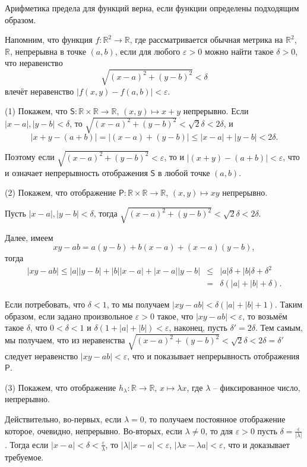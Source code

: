 \begin{corollary}
    Арифметика предела для функций верна, если функции определены подходящим образом.
\end{corollary}

Напомним, что функция $f:\mathbb{R}^2 \to \mathbb{R}$, где рассматривается обычная метрика на $\mathbb{R}^2$, $\mathbb{R}$, непрерывна в точке $(a,b)$, если для любого $\varepsilon >0$ можно найти такое $\delta >0$, что неравенство 
\[
 \sqrt{(x-a)^2 + (y-b)^2} < \delta
\]
влечёт неравенство $|f(x,y) - f(a,b)|< \varepsilon$. 

(1) Покажем, что $\mathsf{S}:\mathbb{R} \times \mathbb{R} \to \mathbb{R}$, $(x,y) \mapsto x+y$  непрерывно. Если $|x-a|, |y-b| <\delta$, то $ \sqrt{(x-a)^2 + (y-b)^2} < \sqrt{2}\delta < 2 \delta$, и 
\[
 |x+y - (a+b)| = |(x-a) + (y-b)| \le |x-a| + |y-b| < 2 \delta.
\]

Поэтому если $\sqrt{(x-a)^2 + (y-b)^2}<\varepsilon$, то и $|(x+y) - (a+b)|< \varepsilon$, что и означает непрерывность отображения $\mathsf{S}$ в любой точке $(a,b).$

(2) Покажем, что отображение $\mathsf{P}: \mathbb{R} \times \mathbb{R} \to \mathbb{R}$, $(x,y) \mapsto xy$ непрерывно. 

Пусть $|x-a|, |y-b| < \delta$, тогда  $\sqrt{(x-a)^2 + (y-b)^2} < \sqrt{2}\delta < 2 \delta$.

Далее, имеем
\[
 xy -ab =a (y-b) + b(x-a) + (x-a)(y-b),
\]
тогда
\begin{eqnarray*}
   |xy -ab| \le |a| |y-b| + |b||x-a| + |x-a||y-b|  & \le &   |a| \delta + |b| \delta + \delta^2\\
   &=& \delta (|a| + |b| + \delta).
\end{eqnarray*}

Если потребовать, что $\delta <1$, то мы получаем $|xy-ab| < \delta (|a| + |b|+1).$ Таким образом, если задано произвольное $\varepsilon >0$ такое, что $|xy -ab| < \varepsilon$, то возьмём такое $\delta$, что $0 < \delta <1$ и $\delta(1 + |a| + |b|)<\varepsilon$, наконец, пусть $\delta' = 2{\delta}$. Тем самым, мы получаем, что из неравенства $\sqrt{(x-a)^2 + (y-b)^2} < \sqrt{2}\delta < 2 \delta = \delta'$ следует неравенство $|xy - ab| < \varepsilon$, что и показывает непрерывность отображения $\mathsf{P}.$

(3) Покажем, что отображение $h_\lambda: \mathbb{R} \to \mathbb{R}$, $x \mapsto \lambda x$, где $\lambda$ -- фиксированное число, непрерывно. 

Действительно, во-первых, если $\lambda  =0$, то получаем постоянное отображение которое, очевидно, непрерывно. Во-вторых, если $\lambda \ne 0$, то для $\varepsilon >0$ пусть $\delta = \frac{\varepsilon}{|\lambda|}$. Тогда если $|x-a|<\delta < \frac{\varepsilon}{\lambda}$, то $|\lambda||x-a| < \varepsilon$, \ie $|\lambda x - \lambda a| < \varepsilon$, что и доказывает требуемое.

